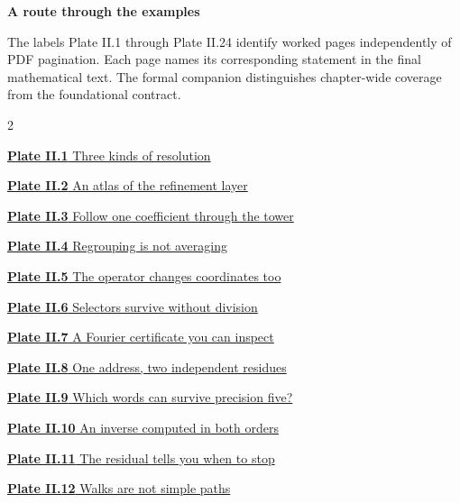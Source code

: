 \documentclass[11pt,a4paper]{article}
\begin{document}
\KomorebiCover
{}


{\sffamily\bfseries\Large\color{accent}A route through the examples}\par\medskip
The labels Plate II.1 through Plate II.24 identify worked pages independently of PDF
pagination. Each page names its corresponding statement in the final
mathematical text. The formal companion distinguishes chapter-wide coverage from the foundational contract.
\medskip
\begin{multicols}{2}
{\small\noindent\hyperlink{vpage1}{\textbf{Plate II.1} Three kinds of resolution}\par\smallskip}
{\small\noindent\hyperlink{vpage2}{\textbf{Plate II.2} An atlas of the refinement layer}\par\smallskip}
{\small\noindent\hyperlink{vpage3}{\textbf{Plate II.3} Follow one coefficient through the tower}\par\smallskip}
{\small\noindent\hyperlink{vpage4}{\textbf{Plate II.4} Regrouping is not averaging}\par\smallskip}
{\small\noindent\hyperlink{vpage5}{\textbf{Plate II.5} The operator changes coordinates too}\par\smallskip}
{\small\noindent\hyperlink{vpage6}{\textbf{Plate II.6} Selectors survive without division}\par\smallskip}
{\small\noindent\hyperlink{vpage7}{\textbf{Plate II.7} A Fourier certificate you can inspect}\par\smallskip}
{\small\noindent\hyperlink{vpage8}{\textbf{Plate II.8} One address, two independent residues}\par\smallskip}
{\small\noindent\hyperlink{vpage9}{\textbf{Plate II.9} Which words can survive precision five?}\par\smallskip}
{\small\noindent\hyperlink{vpage10}{\textbf{Plate II.10} An inverse computed in both orders}\par\smallskip}
{\small\noindent\hyperlink{vpage11}{\textbf{Plate II.11} The residual tells you when to stop}\par\smallskip}
{\small\noindent\hyperlink{vpage12}{\textbf{Plate II.12} Walks are not simple paths}\par\smallskip}

\end{multicols}
\end{document}
